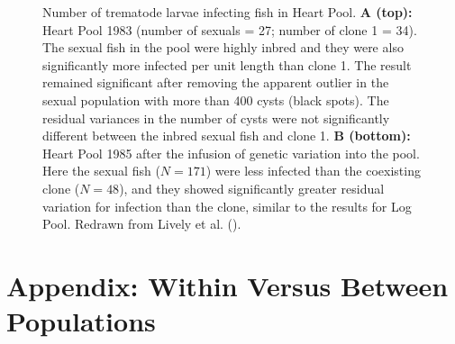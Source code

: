 \documentclass[
  letterpaper,
]{book}
\begin{document}
\begin{figure}


\caption[Number of trematode larvae infecting fish in Heart
Pool]{\label{fig-5-3}Number of trematode larvae infecting fish in Heart
Pool. \textbf{A (top):} Heart Pool 1983 (number of sexuals = 27; number
of clone 1 = 34). The sexual fish in the pool were highly inbred and
they were also significantly more infected per unit length than clone 1.
The result remained significant after removing the apparent outlier in
the sexual population with more than 400 cysts (black spots). The
residual variances in the number of cysts were not significantly
different between the inbred sexual fish and clone 1. \textbf{B
(bottom):} Heart Pool 1985 after the infusion of genetic variation into
the pool. Here the sexual fish (\(N=171\)) were less infected than the
coexisting clone (\(N=48\)), and they showed significantly greater
residual variation for infection than the clone, similar to the results
for Log Pool. Redrawn from Lively et al.
().}

\end{figure}%

\section{Appendix: Within Versus Between Populations}\label{sec-app-5}
\end{document}
